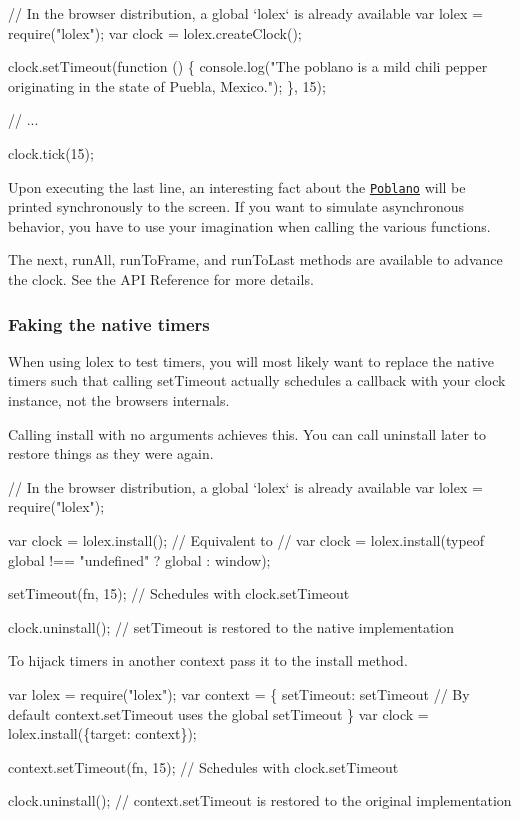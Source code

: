 \begin{DoxyCode}
// In the browser distribution, a global `lolex` is already available
var lolex = require("lolex");
var clock = lolex.createClock();

clock.setTimeout(function () \{
    console.log("The poblano is a mild chili pepper originating in the state of Puebla, Mexico.");
\}, 15);

// ...

clock.tick(15);
\end{DoxyCode}


Upon executing the last line, an interesting fact about the \href{http://en.wikipedia.org/wiki/Poblano}{\tt Poblano} will be printed synchronously to the screen. If you want to simulate asynchronous behavior, you have to use your imagination when calling the various functions.

The {\ttfamily next}, {\ttfamily run\+All}, {\ttfamily run\+To\+Frame}, and {\ttfamily run\+To\+Last} methods are available to advance the clock. See the A\+PI Reference for more details.

\subsubsection*{Faking the native timers}

When using lolex to test timers, you will most likely want to replace the native timers such that calling {\ttfamily set\+Timeout} actually schedules a callback with your clock instance, not the browser\textquotesingle{}s internals.

Calling {\ttfamily install} with no arguments achieves this. You can call {\ttfamily uninstall} later to restore things as they were again.


\begin{DoxyCode}
// In the browser distribution, a global `lolex` is already available
var lolex = require("lolex");

var clock = lolex.install();
// Equivalent to
// var clock = lolex.install(typeof global !== "undefined" ? global : window);

setTimeout(fn, 15); // Schedules with clock.setTimeout

clock.uninstall();
// setTimeout is restored to the native implementation
\end{DoxyCode}


To hijack timers in another context pass it to the {\ttfamily install} method.


\begin{DoxyCode}
var lolex = require("lolex");
var context = \{
    setTimeout: setTimeout // By default context.setTimeout uses the global setTimeout
\}
var clock = lolex.install(\{target: context\});

context.setTimeout(fn, 15); // Schedules with clock.setTimeout

clock.uninstall();
// context.setTimeout is restored to the original implementation
\end{DoxyCode}


